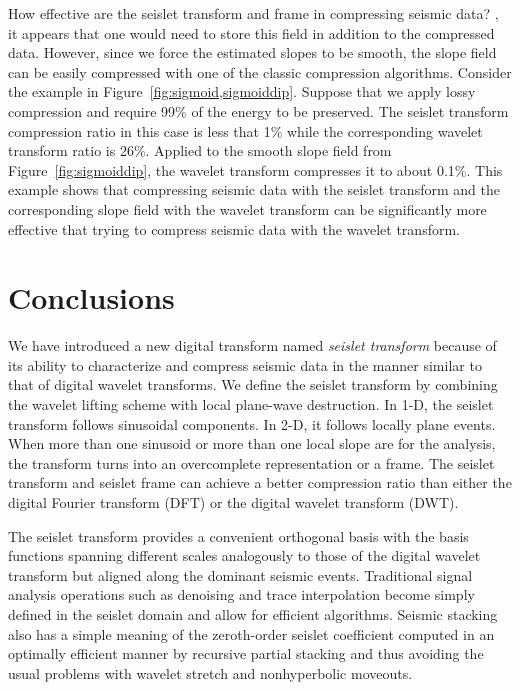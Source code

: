 How effective are the seislet transform and frame in compressing
seismic data? , it appears that  one would need to store this
field in addition to the compressed data. However, since we force the
estimated slopes to be smooth, the slope field can be easily
compressed with one of the classic compression algorithms. Consider
the example in Figure~\ref{fig:sigmoid,sigmoiddip}. Suppose that we
apply lossy compression and require 99\% of the energy to be
preserved. The seislet transform compression ratio in this case is
less that 1\% while the corresponding wavelet transform ratio is
26\%. Applied to the smooth slope field from
Figure~\ref{fig:sigmoiddip}, the wavelet transform compresses it to
about 0.1\%. This example shows that compressing seismic data with the
seislet transform and the corresponding slope field with the wavelet
transform can be significantly more effective that trying to compress
seismic data with the wavelet transform.

\section{Conclusions}

We have introduced a new digital transform named \emph{seislet
transform} because of its ability to characterize and compress seismic
data in the manner similar to that of digital wavelet transforms. We
define the seislet transform by combining the wavelet lifting scheme
with local plane-wave destruction.  In 1-D, the seislet transform
follows sinusoidal components. In 2-D, it follows locally plane
events. When more than one sinusoid or more than one local slope are
  for the analysis, the transform turns into an overcomplete
representation or a frame. The seislet transform and seislet frame can
achieve a better compression ratio than either the digital Fourier
transform (DFT) or the digital wavelet transform (DWT).

The seislet transform provides a convenient orthogonal basis with the basis 
functions spanning different scales analogously to those of the digital wavelet
transform but aligned along the dominant seismic events. Traditional signal 
analysis operations such as denoising and trace interpolation become simply 
defined in the seislet domain and allow for efficient algorithms. 
Seismic stacking also has a simple meaning of the zeroth-order seislet 
coefficient computed in an optimally efficient manner by recursive partial 
stacking and thus avoiding the usual problems with wavelet stretch and 
nonhyperbolic moveouts. 

